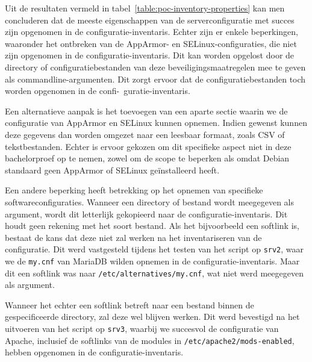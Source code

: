 Uit de resultaten vermeld in tabel~\ref{table:poc-inventory-properties} kan men concluderen dat de meeste eigenschappen van de serverconfiguratie met succes zijn opgenomen in de configuratie-inventaris.
Echter zijn er enkele beperkingen, waaronder het ontbreken van de AppArmor- en SELinux-configuraties, die niet zijn opgenomen in de configuratie-inventaris.
Dit kan worden opgelost door de directory of configuratiebestanden van deze beveiligingsmaatregelen mee te geven als commandline-argumenten.
Dit zorgt ervoor dat de configuratiebestanden toch worden opgenomen in de confi-\ guratie-inventaris.

Een alternatieve aanpak is het toevoegen van een aparte sectie waarin we de configuratie van AppArmor en SELinux kunnen opnemen.
Indien gewenst kunnen deze gegevens dan worden omgezet naar een leesbaar formaat, zoals CSV of tekstbestanden.
Echter is ervoor gekozen om dit specifieke aspect niet in deze bachelorproef op te nemen, zowel om de scope te beperken als omdat Debian standaard geen AppArmor of SELinux ge\"installeerd heeft.

Een andere beperking heeft betrekking op het opnemen van specifieke softwareconfiguraties.
Wanneer een directory of bestand wordt meegegeven als argument, wordt dit letterlijk gekopieerd naar de configuratie-inventaris.
Dit houdt geen rekening met het soort bestand.
Als het bijvoorbeeld een softlink is, bestaat de kans dat deze niet zal werken na het inventariseren van de configuratie.
Dit werd vastgesteld tijdens het testen van het script op \texttt{srv2}, waar we de \texttt{my.cnf} van MariaDB wilden opnemen in de configuratie-inventaris.
Maar dit een softlink was naar \texttt{/etc/alternatives/my.cnf}, wat niet werd meegegeven als argument.

Wanneer het echter een softlink betreft naar een bestand binnen de gespecificeerde directory, zal deze wel blijven werken.
Dit werd bevestigd na het uitvoeren van het script op \texttt{srv3}, waarbij we succesvol de configuratie van Apache, inclusief de softlinks van de modules in \texttt{/etc/apache2/mods-enabled}, hebben opgenomen in de configuratie-inventaris.

